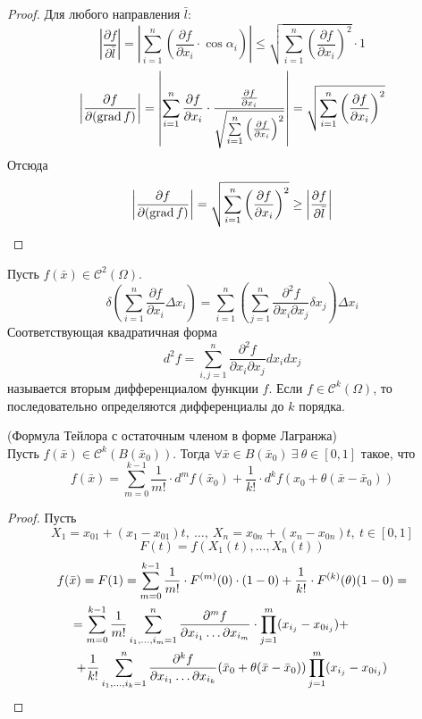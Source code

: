 \begin{proof}
    Для любого направления $\bar{l}$:
    \[\left|\frac{\partial {f}}{\partial {\bar{l}}}\right|=\left|\sum\limits_{i=1}^{n}\left(\frac{\partial {f}}{\partial {x_i}}\cdot \cos{\alpha_i}\right)\right|\leq \sqrt{\sum\limits_{i=1}^{n}\left(\frac{\partial {f}}{\partial {x_i}}\right)^2}\cdot 1\]
    \[\left|\frac{\partial {f}}{\partial {(\grad{f})}}\right|=\left|\sum\limits_{i=1}^{n}\frac{\partial {f}}{\partial {x_i}}\cdot \frac{\frac{\partial {f}}{\partial {x_i}}}{\sqrt{\sum\limits_{i=1}^{n}\left(\frac{\partial {f}}{\partial {x_i}}\right)^2}}\right|=\sqrt{\sum\limits_{i=1}^{n}\left(\frac{\partial {f}}{\partial {x_i}}\right)^2}\]
    Отсюда
    \[\left|\frac{\partial {f}}{\partial {(\grad{f})}}\right|=\sqrt{\sum\limits_{i=1}^{n}\left(\frac{\partial {f}}{\partial {x_i}}\right)^2}\geq \left|\frac{\partial {f}}{\partial {\bar{l}}}\right|\]

\end{proof} 
\begin{definition}
    Пусть $f(\bar{x})\in \mathcal{C}^2(\Omega)$.
    \[\delta(\sum\limits_{i=1}^{n}\frac{\partial {f}}{\partial {x_i}}\Delta x_i)=\sum\limits_{i=1}^{n}\left(\sum\limits_{j=1}^{n}\frac{\partial^2 {f}}{\partial {x_i}\partial{x_j}}\delta x_j\right)\Delta x_i\]
    Соответствующая квадратичная форма
    \[d^2f=\sum\limits_{i,j=1}^{n}\frac{\partial^2 {f}}{\partial {x_i}\partial{x_j}} d x_i dx_j\]
    называется вторым дифференциалом функции $f$. Если $f\in \mathcal{C}^k(\Omega)$, то последовательно определяются дифференциалы до $k$ порядка.
\end{definition} 
\begin{theorem} (Формула Тейлора с остаточным членом в форме Лагранжа)\\
    Пусть $f(\bar{x})\in \mathcal{C}^k(B(\bar{x}_0))$. Тогда $\forall \bar{x}\in B(\bar{x}_0)\ \exists\ \theta\in [0,1]$ такое, что
    \[f(\bar{x})=\sum\limits_{m=0}^{k-1}\frac{1}{m!}\cdot d^m f(\bar{x}_0)+\frac{1}{k!}\cdot d^k f(x_0+\theta(\bar{x}-\bar{x}_0))\] 
\end{theorem} 
\begin{proof}
    Пусть 
    \[X_1=x_{01}+(x_1-x_{01})t,\ \dots,\ X_n=x_{0n}+(x_n-x_{0n})t,\ t\in [0,1]\]
    \[F(t)=f(X_1(t),\dots, X_n(t))\]
    \begin{multline*}
        f(\bar{x})=F(1)=\sum\limits_{m=0}^{k-1}\frac{1}{m!}\cdot F^{(m)}(0)\cdot (1-0)+\frac{1}{k!}\cdot F^{(k)}(\theta)(1-0)=\\\
        =\sum\limits_{m=0}^{k-1}\frac{1}{m!}\sum\limits_{i_1,\dots,i_m=1}^{n}\frac{\partial^m {f}}{\partial {x_{i_1}} \dots \partial x_{i_m}}\cdot \prod\limits_{j=1}^{m}(x_{i_j}-x_{0i_j})+\tab[1.3cm]\\
        +\frac{1}{k!}\sum\limits_{i_1,\dots,i_k=1}^{n}\frac{\partial^k {f}}{\partial {x_{i_1}}\dots \partial x_{i_k}}(\bar{x}_0+\theta(\bar{x}-\bar{x}_0)) \prod\limits_{j=1}^{m}(x_{i_j}-x_{0i_j})
    \end{multline*}
\end{proof} 
